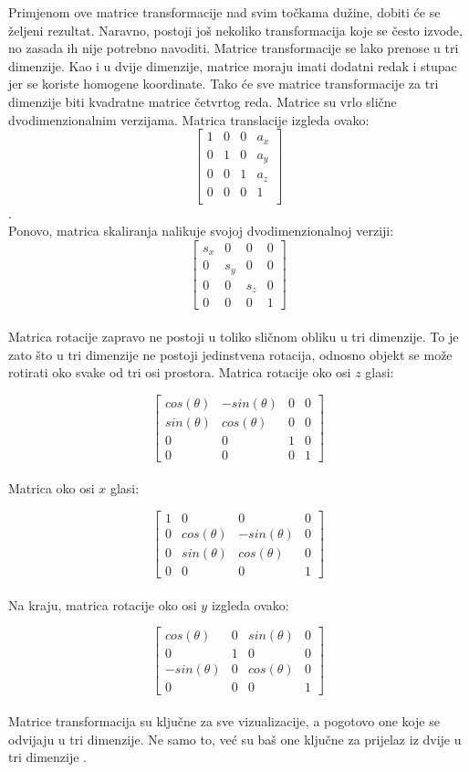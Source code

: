 \documentclass{foi}
\begin{document}
Primjenom ove matrice transformacije nad svim točkama dužine, dobiti će se željeni rezultat. Naravno, postoji još nekoliko transformacija koje se često izvode, no zasada ih nije potrebno navoditi. Matrice transformacije se lako prenose u tri dimenzije. Kao i u dvije dimenzije, matrice moraju imati dodatni redak i stupac jer se koriste homogene koordinate. Tako će sve matrice transformacije za tri dimenzije biti kvadratne matrice četvrtog reda. Matrice su vrlo slične dvodimenzionalnim verzijama. Matrica translacije izgleda ovako:
\[
\begin{bmatrix}
	1 & 0 & 0 & a_x\\
	0 & 1 & 0 & a_y\\
	0 & 0 & 1 & a_z\\
	0 & 0 & 0 & 1\\
\end{bmatrix}
\].
\\Ponovo, matrica skaliranja nalikuje svojoj dvodimenzionalnoj verziji:
\[
\begin{bmatrix}
	s_x & 0 & 0 & 0\\
	0 & s_y & 0 & 0\\
	0 & 0 & s_z & 0\\
	0 & 0 & 0 & 1
\end{bmatrix}
\]
\\Matrica rotacije zapravo ne postoji u toliko sličnom obliku u tri dimenzije. To je zato što u tri dimenzije ne postoji jedinstvena rotacija, odnosno objekt se može rotirati oko svake od tri osi prostora. Matrica rotacije oko osi $z$ glasi:

\[
\begin{bmatrix}
	cos(\theta) & -sin(\theta) & 0 & 0\\
	sin(\theta) & cos(\theta) & 0 & 0\\
	0 & 0 & 1 & 0\\
	0 & 0 & 0 & 1
\end{bmatrix}
\]
\\Matrica oko osi $x$ glasi:

\[
\begin{bmatrix}
	1 & 0 & 0 & 0\\
	0 & cos(\theta) & -sin(\theta) & 0\\
	0 & sin(\theta) & cos(\theta) & 0\\
	0 & 0 & 0 & 1
\end{bmatrix}
\]
\\Na kraju, matrica rotacije oko osi $y$ izgleda ovako:

\[
\begin{bmatrix}
	cos(\theta) & 0 & sin(\theta) & 0\\
	0 & 1 & 0 & 0\\
	-sin(\theta) & 0 & cos(\theta) & 0\\
	0 & 0 & 0 & 1
\end{bmatrix}
\]
\\Matrice transformacija su ključne za sve vizualizacije, a pogotovo one koje se odvijaju u tri dimenzije. Ne samo to, već su baš one ključne za prijelaz iz dvije u tri dimenzije \parencite{TransformationMatricesBezDat}.
\end{document}
